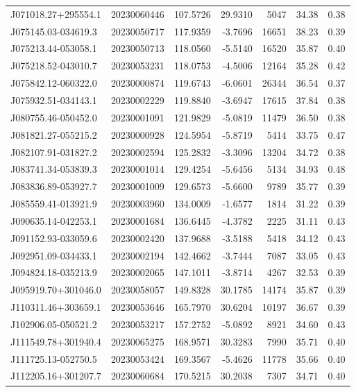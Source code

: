 \documentclass{article}
\begin{document}
\begin {longtable}{|l|l|r|r|r|r|r|}
 J071018.27+295554.1&  20230060446&  107.5726&   29.9310&  5047& 34.38& 0.38\\
 J075145.03-034619.3&  20230050717&  117.9359&   -3.7696& 16651& 38.23& 0.39\\
 J075213.44-053058.1&  20230050713&  118.0560&   -5.5140& 16520& 35.87& 0.40\\
 J075218.52-043010.7&  20230053231&  118.0753&   -4.5006& 12164& 35.28& 0.42\\
 J075842.12-060322.0&  20230000874&  119.6743&   -6.0601& 26344& 36.54& 0.37\\
 J075932.51-034143.1&  20230002229&  119.8840&   -3.6947& 17615& 37.84& 0.38\\
 J080755.46-050452.0&  20230001091&  121.9829&   -5.0819& 11479& 36.50& 0.38\\
 J081821.27-055215.2&  20230000928&  124.5954&   -5.8719&  5414& 33.75& 0.47\\
 J082107.91-031827.2&  20230002594&  125.2832&   -3.3096& 13204& 34.72& 0.38\\
 J083741.34-053839.3&  20230001014&  129.4254&   -5.6456&  5134& 34.93& 0.48\\
 J083836.89-053927.7&  20230001009&  129.6573&   -5.6600&  9789& 35.77& 0.39\\
 J085559.41-013921.9&  20230003960&  134.0009&   -1.6577&  1814& 31.22& 0.39\\
 J090635.14-042253.1&  20230001684&  136.6445&   -4.3782&  2225& 31.11& 0.43\\
 J091152.93-033059.6&  20230002420&  137.9688&   -3.5188&  5418& 34.12& 0.43\\
 J092951.09-034433.1&  20230002194&  142.4662&   -3.7444&  7087& 33.05& 0.43\\
 J094824.18-035213.9&  20230002065&  147.1011&   -3.8714&  4267& 32.53& 0.39\\
 J095919.70+301046.0&  20230058057&  149.8328&   30.1785& 14174& 35.87& 0.39\\
 J110311.46+303659.1&  20230053646&  165.7970&   30.6204& 10197& 36.67& 0.39\\
 J102906.05-050521.2&  20230053217&  157.2752&   -5.0892&  8921& 34.60& 0.43\\   
 J111549.78+301940.4&  20230065275&  168.9571&   30.3283&  7990& 35.71& 0.40\\
 J111725.13-052750.5&  20230053424&  169.3567&   -5.4626& 11778& 35.66& 0.40\\
 J112205.16+301207.7&  20230060684&  170.5215&   30.2038&  7307& 34.71& 0.40\\

\end{longtable}
\end{document}
